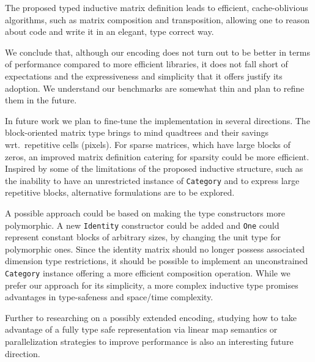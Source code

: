 \documentclass[sigplan,screen]{acmart}
\newcommand{\hs}{\texttt}
\begin{document}
The proposed typed inductive matrix definition leads to efficient, cache-oblivious algorithms, such as matrix composition and transposition, allowing one to reason about code and write it in an elegant, type correct way.

We conclude that, although our encoding does not turn out to be better in terms of performance compared to more efficient libraries, it does not fall short of expectations and the expressiveness and simplicity that it offers justify its adoption. We understand our benchmarks are somewhat thin and plan to refine them in the future.

In future work we plan to fine-tune the implementation in several directions.
The block-oriented matrix type brings to mind quadtrees \cite{samet1984quadtree} and their savings wrt.\ repetitive cells (pixels). For sparse matrices, which have large blocks of zeros, an improved matrix definition catering for sparsity could be more efficient. Inspired by some of the limitations of the proposed inductive structure, such as the inability to have an unrestricted instance of \hs{Category} and to express large repetitive blocks, alternative formulations are to be explored. 

A possible approach could be based on making the type constructors more polymorphic.
A new \hs{Identity} constructor could be added and \hs{One} could represent constant blocks of arbitrary sizes, by changing the unit type for polymorphic ones. Since the identity matrix should no longer possess associated dimension type restrictions, it should be possible to implement an unconstrained \hs{Category} instance offering a more efficient composition operation.
While we prefer our approach for its simplicity, a more complex inductive type promises advantages in type-safeness and space/time complexity.

Further to researching on a possibly extended encoding, studying how to take advantage of a fully type safe representation via linear map semantics or parallelization strategies to improve performance is also an interesting future direction.
\end{document}
